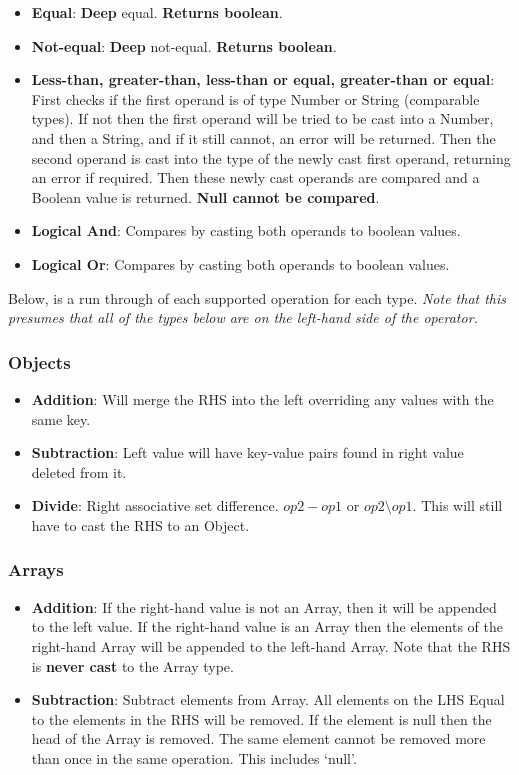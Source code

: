 \begin{itemize}
    \item \textbf{Equal}: \textbf{Deep} equal. \textbf{Returns boolean}.
    \item \textbf{Not-equal}: \textbf{Deep} not-equal. \textbf{Returns boolean}.
    \item \textbf{Less-than, greater-than, less-than or equal, greater-than or equal}: First checks if the first operand is of type Number or String (comparable types). If not then the first operand will be tried to be cast into a Number, and then a String, and if it still cannot, an error will be returned. Then the second operand is cast into the type of the newly cast first operand, returning an error if required. Then these newly cast operands are compared and a Boolean value is returned. \textbf{Null cannot be compared}.
    \item \textbf{Logical And}: Compares by casting both operands to boolean values.
    \item \textbf{Logical Or}: Compares by casting both operands to boolean values.
\end{itemize}

Below, is a run through of each supported operation for each type. \textit{Note that this presumes that all of the types below are on the left-hand side of the operator.}

\subsubsection{Objects}

\begin{itemize}
    \item \textbf{Addition}: Will merge the RHS into the left overriding any values with the same key.
    \item \textbf{Subtraction}: Left value will have key-value pairs found in right value deleted from it.
    \item \textbf{Divide}: Right associative set difference. $op2 - op1$ or $op2 \setminus op1$. This will still have to cast the RHS to an Object.
\end{itemize}

\subsubsection{Arrays}

\begin{itemize}
    \item \textbf{Addition}: If the right-hand value is not an Array, then it will be appended to the left value. If the right-hand value is an Array then the elements of the right-hand Array will be appended to the left-hand Array. Note that the RHS is \textbf{never cast} to the Array type.
    \item \textbf{Subtraction}: Subtract elements from Array. All elements on the LHS Equal to the elements in the RHS will be removed. If the element is null then the head of the Array is removed. The same element cannot be removed more than once in the same operation. This includes `null'.
\end{itemize}

